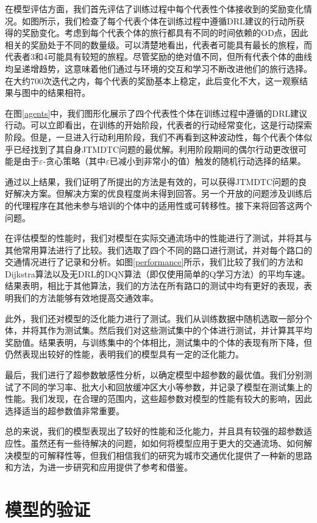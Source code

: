 在模型评估方面，我们首先评估了训练过程中每个代表性个体接收到的奖励变化情况。如图所示，我们检查了每个代表个体在训练过程中遵循DRL建议的行动所获得的奖励变化。考虑到每个代表个体的旅行都具有不同的时间依赖的OD点，因此相关的奖励处于不同的数量级。可以清楚地看出，代表者可能具有最长的旅程，而代表者3和4可能具有较短的旅程。尽管奖励的绝对值不同，但所有代表个体的曲线均呈递增趋势，这意味着他们通过与环境的交互和学习不断改进他们的旅行选择。在大约700次迭代之内，每个代表的奖励基本上稳定，此后变化不大，这一观察结果与图中的结果相符。

在图\ref{agents}中，我们图形化展示了四个代表性个体在训练过程中遵循的DRL建议行动。可以立即看出，在训练的开始阶段，代表者的行动经常变化，这是行动探索阶段。但是，一旦进入行动利用阶段，我们不再看到这种波动性，每个代表个体似乎已经找到了其自身JTMDTC问题的最优解。利用阶段期间的偶尔行动更改很可能是由于$\varepsilon$-贪心策略（其中$\varepsilon$已减小到非常小的值）触发的随机行动选择的结果。

通过以上结果，我们证明了所提出的方法是有效的，可以获得JTMDTC问题的良好解决方案。但解决方案的优良程度尚未得到回答。另一个开放的问题涉及训练后的代理程序在其他未参与培训的个体中的适用性或可转移性。接下来将回答这两个问题。

在评估模型的性能时，我们对模型在实际交通流场中的性能进行了测试，并将其与其他常用算法进行了比较。我们选取了四个不同的路口进行测试，并对每个路口的交通情况进行了记录和分析。如图\ref{performance}所示，我们比较了我们的方法和Dijkstra算法以及无DRL的DQN算法（即仅使用简单的Q学习方法）的平均车速。结果表明，相比于其他算法，我们的方法在所有路口的测试中均有更好的表现，表明我们的方法能够有效地提高交通效率。

此外，我们还对模型的泛化能力进行了测试。我们从训练数据中随机选取一部分个体，并将其作为测试集。然后我们对这些测试集中的个体进行测试，并计算其平均奖励值。结果表明，与训练集中的个体相比，测试集中的个体的表现有所下降，但仍然表现出较好的性能，表明我们的模型具有一定的泛化能力。

最后，我们进行了超参数敏感性分析，以确定模型中超参数的最优值。我们分别测试了不同的学习率、批大小和回放缓冲区大小等参数，并记录了模型在测试集上的性能。我们发现，在合理的范围内，这些超参数对模型的性能有较大的影响，因此选择适当的超参数值非常重要。

总的来说，我们的模型表现出了较好的性能和泛化能力，并且具有较强的超参数适应性。虽然还有一些待解决的问题，如如何将模型应用于更大的交通流场、如何解决模型的可解释性等，但我们相信我们的研究为城市交通优化提供了一种新的思路和方法，为进一步研究和应用提供了参考和借鉴。


\section{模型的验证}

